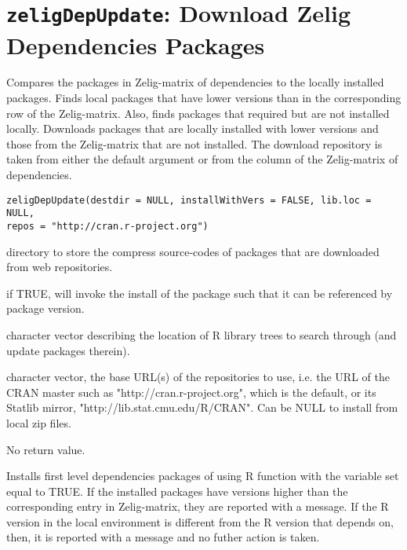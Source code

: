  \section{{\tt zeligDepUpdate}: Download Zelig Dependencies Packages}\label{ss:zeligDepUpdate}
\begin{Description}\relax
Compares the packages in Zelig-matrix of dependencies  to the
locally installed packages. Finds local packages that have lower
versions than in the corresponding row of the Zelig-matrix.
Also, finds packages that  required but are not
installed locally.
Downloads packages that are locally installed with lower versions and
those from the Zelig-matrix that are not installed.
The download repository is taken from either the default
 argument or from the  column of
the Zelig-matrix of dependencies.
\end{Description}
\begin{Usage}
\begin{verbatim}
zeligDepUpdate(destdir = NULL, installWithVers = FALSE, lib.loc = NULL,
repos = "http://cran.r-project.org")
\end{verbatim}
\end{Usage}
\begin{Arguments}
\begin{ldescription}
\item[\code{destdir}] directory to store the compress source-codes of
packages that are downloaded from web repositories.
\item[\code{installWithVers}] if TRUE, will invoke the install of the
package such that it can be referenced by package version.
\item[\code{lib.loc}] character vector describing the location of R
library trees to search through (and update packages therein). 
\item[\code{repos}] character vector, the base URL(s) of the repositories to
use, i.e. the URL of the CRAN master such as
"http://cran.r-project.org", which is the default, or its Statlib
mirror, "http://lib.stat.cmu.edu/R/CRAN". Can be NULL to install
from local zip files.
\end{ldescription}
\end{Arguments}
\begin{Value}
No return value.
\end{Value}
\begin{Note}\relax
Installs first level dependencies packages of  using R function
 with the variable  set
equal to TRUE.  If the installed packages have versions higher than the
corresponding entry in Zelig-matrix, they are reported with a
message. If the R version in the local environment is different from
the R version that  depends on, then, it is reported with a message and no futher action is taken.
\end{Note}
